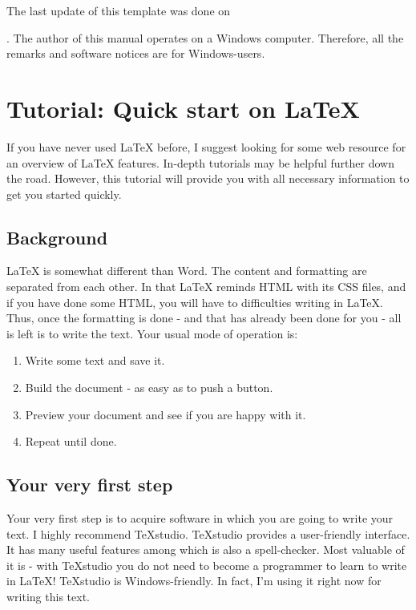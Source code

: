 \documentclass{article}
\begin{document}
The last update of this template was done on \date{\today}. The author of this manual operates on a Windows computer. Therefore, all the remarks and software notices are for Windows-users.
\section{Tutorial: Quick start on LaTeX{}}\label{sl:quick_start}
If you have never used LaTeX{} before, I suggest looking for some web resource for an overview of LaTeX{} features. In-depth tutorials may be helpful further down the road. However, this tutorial will provide you with all necessary information to get you started quickly. 
\subsection{Background}\label{latex_background}
LaTeX{} is somewhat different than Word. The content and formatting are separated from each other. In that LaTeX{} reminds HTML with its CSS files, and if you have done some HTML, you will have to difficulties writing in LaTeX{}. Thus, once the formatting is done - and that has already been done for you - all is left is to write the text. Your usual mode of operation is:
\begin{enumerate} \itemsep1pt \parskip0pt 
  \item Write some text and save it.
  \item Build the document - as easy as to push a button.
  \item Preview your document and see if you are happy with it.
  \item Repeat until done.
\end{enumerate}
\subsection{Your very first step}\label{latex_1st_step}
Your very first step is to acquire software in which you are going to write your text. I highly recommend TeXstudio. TeXstudio provides a user-friendly interface. It has many useful features among which is also a spell-checker. Most valuable of it is - with TeXstudio you do not need to become a programmer to learn to write in LaTeX{}! TeXstudio is Windows-friendly. In fact, I'm using it right now for writing this text. 
\end{document}
